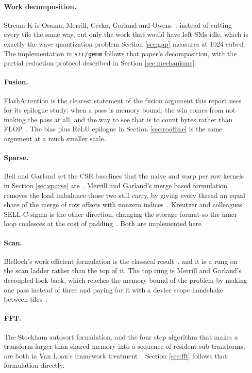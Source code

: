 \paragraph{Work decomposition.} Stream-K is Osama, Merrill, Cecka, Garland and
Owens~\cite{osama2023}: instead of cutting every tile the same way, cut only the
work that would have left SMs idle, which is exactly the wave quantization problem
Section \ref{sec:gap} measures at 1024 cubed. The implementation in
\texttt{src/gemm} follows that paper's decomposition, with the partial reduction
protocol described in Section \ref{sec:mechanisms}.

\paragraph{Fusion.} FlashAttention is the clearest statement of the fusion
argument this report uses for its epilogue study: when a pass is memory bound, the
win comes from not making the pass at all, and the way to see that is to count
bytes rather than FLOP~\cite{dao2022}. The bias plus ReLU epilogue in Section
\ref{sec:roofline} is the same argument at a much smaller scale.

\paragraph{Sparse.} Bell and Garland set the CSR baselines that the naive and warp
per row kernels in Section \ref{sec:sparse} are~\cite{bell2009}. Merrill and
Garland's merge based formulation removes the load imbalance those two still
carry, by giving every thread an equal share of the merge of row offsets with
nonzero indices~\cite{merrill2016spmv}. Kreutzer and colleagues' SELL-C-sigma is
the other direction, changing the storage format so the inner loop coalesces at
the cost of padding~\cite{kreutzer2014}. Both are implemented here.

\paragraph{Scan.} Blelloch's work efficient formulation is the classical
result~\cite{blelloch1990}, and it is a rung on the scan ladder rather than the top
of it. The top rung is Merrill and Garland's decoupled look-back, which reaches the
memory bound of the problem by making one pass instead of three and paying for it
with a device scope handshake between tiles~\cite{merrill2016scan}.

\paragraph{FFT.} The Stockham autosort formulation, and the four step algorithm
that makes a transform larger than shared memory into a sequence of resident sub
transforms, are both in Van Loan's framework treatment~\cite{vanloan1992}. Section
\ref{sec:fft} follows that formulation directly.

